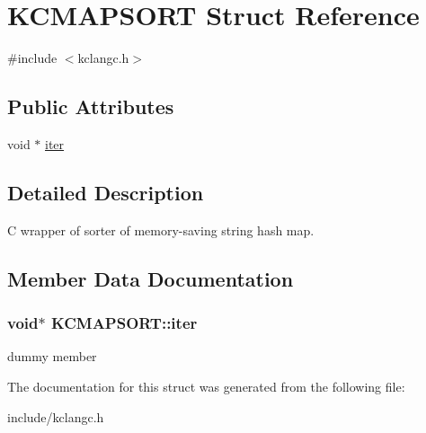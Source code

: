 \hypertarget{structKCMAPSORT}{\section{\-K\-C\-M\-A\-P\-S\-O\-R\-T \-Struct \-Reference}
\label{structKCMAPSORT}
}


{\ttfamily \#include $<$kclangc.\-h$>$}

\subsection*{\-Public \-Attributes}
\begin{DoxyCompactItemize}
\item 
void $\ast$ \hyperlink{structKCMAPSORT_ad61ed6705e01da5916b291e4eef04c8a}{iter}
\end{DoxyCompactItemize}


\subsection{\-Detailed \-Description}
\-C wrapper of sorter of memory-\/saving string hash map. 

\subsection{\-Member \-Data \-Documentation}
\hypertarget{structKCMAPSORT_ad61ed6705e01da5916b291e4eef04c8a}{
\subsubsection[{iter}]{\setlength{\rightskip}{0pt plus 5cm}void$\ast$ {\bf \-K\-C\-M\-A\-P\-S\-O\-R\-T\-::iter}}}\label{structKCMAPSORT_ad61ed6705e01da5916b291e4eef04c8a}
dummy member 

\-The documentation for this struct was generated from the following file\-:\begin{DoxyCompactItemize}
\item 
include/kclangc.\-h\end{DoxyCompactItemize}
